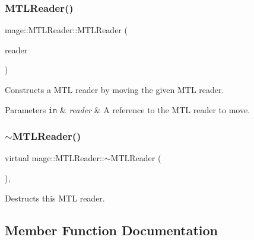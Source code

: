 \subsubsection{\texorpdfstring{M\+T\+L\+Reader()}{MTLReader()}\hspace{0.1cm}{\footnotesize\ttfamily [3/3]}}
{\footnotesize\ttfamily mage\+::\+M\+T\+L\+Reader\+::\+M\+T\+L\+Reader (\begin{DoxyParamCaption}\item[{\hyperlink{classmage_1_1_m_t_l_reader}{M\+T\+L\+Reader} \&\&}]{reader }\end{DoxyParamCaption})\hspace{0.3cm}{\ttfamily [delete]}}

Constructs a M\+TL reader by moving the given M\+TL reader.


\begin{DoxyParams}[1]{Parameters}
\mbox{\tt in}  & {\em reader} & A reference to the M\+TL reader to move. \\
\hline
\end{DoxyParams}
\hypertarget{classmage_1_1_m_t_l_reader_af07011b505c88680a8381c00cb512242}{}\label{classmage_1_1_m_t_l_reader_af07011b505c88680a8381c00cb512242} 
\subsubsection{\texorpdfstring{$\sim$\+M\+T\+L\+Reader()}{~MTLReader()}}
{\footnotesize\ttfamily virtual mage\+::\+M\+T\+L\+Reader\+::$\sim$\+M\+T\+L\+Reader (\begin{DoxyParamCaption}{ }\end{DoxyParamCaption})\hspace{0.3cm}{\ttfamily [virtual]}, {\ttfamily [default]}}

Destructs this M\+TL reader. 

\subsection{Member Function Documentation}
\hypertarget{classmage_1_1_m_t_l_reader_ae239ac085326919918a418edabcafeae}{}\label{classmage_1_1_m_t_l_reader_ae239ac085326919918a418edabcafeae} 
